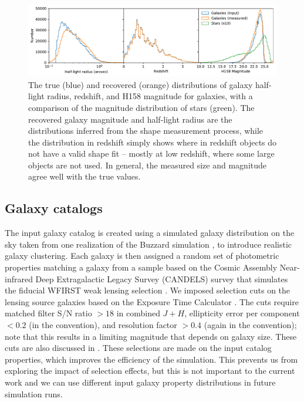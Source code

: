 \documentclass[usenatbib]{mnras}
\begin{document}
\begin{figure}
\begin{center}
\includegraphics[width=\textwidth]{figures/hist.pdf}
\end{center}
\caption[]{
The true (blue) and recovered (orange) distributions of galaxy half-light radius, redshift, and H158 magnitude for galaxies, with a comparison of the magnitude distribution of stars (green). The recovered galaxy magnitude and half-light radius are the distributions inferred from the shape measurement process, while the distribution in redshift simply shows where in redshift objects do not have a valid shape fit -- mostly at low redshift, where some large objects are not used. In general, the measured size and magnitude agree well with the true values.
\label{fig:hist}}
\end{figure}

\subsection{Galaxy catalogs}\label{galcats}

The input galaxy catalog is created using a simulated galaxy distribution on the sky taken from one realization of the Buzzard simulation \citep{2019arXiv190102401D,wechsler2019}, to introduce realistic galaxy clustering. 
Each galaxy is then assigned a random set of photometric properties matching a galaxy from a sample based on the Cosmic Assembly Near-infrared Deep Extragalactic Legacy Survey (CANDELS) survey that simulates the fiducial WFIRST weak lensing selection \citep{2019ApJ...877..117H}. We imposed selection cuts on the lensing source galaxies based on the Exposure Time Calculator \citep{2012arXiv1204.5151H}. The cuts require matched filter S/N ratio $>18$ in combined $J+H$, ellipticity error per component $<0.2$ (in the \citealt{2002AJ....123..583B} convention), and resolution factor $>0.4$ (again in the \citealt{2002AJ....123..583B} convention); note that this results in a limiting magnitude that depends on galaxy size. These cuts are also discussed in \cite{2019ApJ...877..117H}. These selections are made on the input catalog properties, which improves the efficiency of the simulation. This prevents us from exploring the impact of selection effects, but this is not important to the current work and we can use different input galaxy property distributions in future simulation runs.
\end{document}
